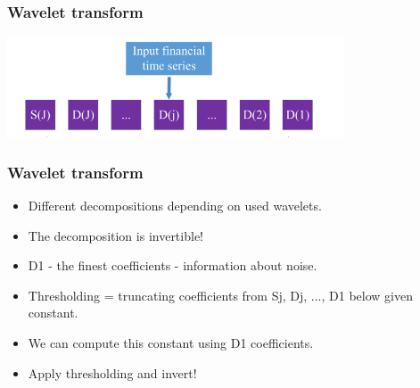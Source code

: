 \documentclass{beamer}
\begin{document}
\begin{frame}
\frametitle{Wavelet transform}
\begin{center}
\includegraphics[width=10cm]{wavelet_transform.png}
\end{center}
\end{frame}

\begin{frame}
\frametitle{Wavelet transform}
\begin{itemize}
\item Different decompositions depending on used wavelets.
\item The decomposition is invertible!
\item D1 - the finest coefficients - information about noise.
\item Thresholding = truncating coefficients from Sj, Dj, ..., D1 below given constant.
\item We can compute this constant using D1 coefficients.
\item Apply thresholding and invert!
\end{itemize}
\end{frame}
\end{document}
